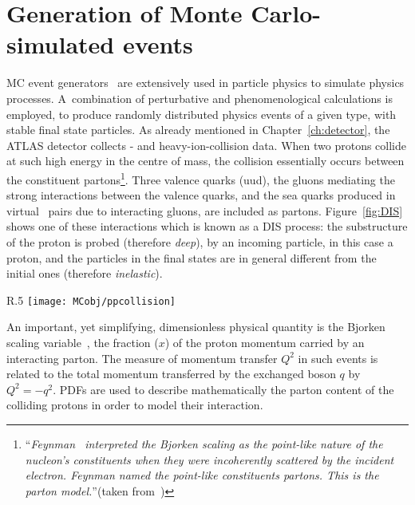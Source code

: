 	\section{Generation of Monte Carlo-simulated events}
	\label{sec:evGen}

		\ac{MC} event generators~\cite{Buckley:2011ms} are extensively used in particle physics to simulate physics processes. A combination of perturbative and phenomenological calculations is employed, to produce randomly distributed physics events of a given type, with stable final state particles. As already mentioned in Chapter~\ref{ch:detector}, the \ac{ATLAS} detector collects \pp- and heavy-ion-collision data. When two protons collide at such high energy in the centre of mass, the collision essentially occurs between the constituent partons\footnote{``\emph{Feynman~\cite{PhysRevLett.23.1415} interpreted the Bjorken scaling as the point-like nature of the nucleon's constituents when they were incoherently scattered by the incident electron. Feynman named the point-like constituents partons. This is the parton model.}''(taken from~\cite{Yan:2014kna})}. Three valence quarks (uud), the gluons mediating the strong interactions between the valence quarks, and the sea quarks produced in virtual \qqbar\ pairs due to interacting gluons, are included as partons. Figure~\ref{fig:DIS} shows one of these interactions which is known as a \ac{DIS} process: the substructure of the proton is probed (therefore \emph{deep}), by an incoming particle, in this case a proton, and the particles in the final states are in general different from the initial ones (therefore \emph{inelastic}).

		\begin{wrapfigure}{R}{.5\textwidth}
			\centering\texttt{[image: MCobj/ppcollision]}
			\caption{\label{fig:DIS} Example of a \pp\ \ac{DIS} event.}
		\end{wrapfigure}
		
		An important, yet simplifying, dimensionless physical quantity is the Bjorken scaling variable~\cite{PhysRev.179.1547}, the fraction ($x$) of the proton momentum carried by an interacting parton. The measure of momentum transfer $Q^2$ in such events is related to the total momentum transferred by the exchanged boson $q$ by $Q^2 = -q^2$. \acp{PDF} are used to describe mathematically the parton content of the colliding protons in order to model their interaction.  

